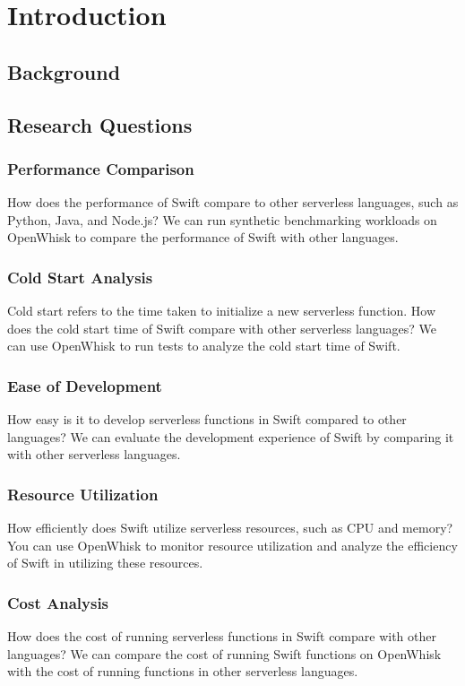 \chapter{Introduction}
\section{Background}
\section{Research Questions}
\subsection{Performance Comparison}
How does the performance of Swift compare to other serverless languages, such as Python, Java, and Node.js? We can run synthetic benchmarking workloads on OpenWhisk to compare the performance of Swift with other languages.
\subsection{Cold Start Analysis}
Cold start refers to the time taken to initialize a new serverless function. How does the cold start time of Swift compare with other serverless languages? We can use OpenWhisk to run tests to analyze the cold start time of Swift.
\subsection{Ease of Development}
How easy is it to develop serverless functions in Swift compared to other languages? We can evaluate the development experience of Swift by comparing it with other serverless languages.
\subsection{Resource Utilization}
How efficiently does Swift utilize serverless resources, such as CPU and memory? You can use OpenWhisk to monitor resource utilization and analyze the efficiency of Swift in utilizing these resources.
\subsection{Cost Analysis}
How does the cost of running serverless functions in Swift compare with other languages? We can compare the cost of running Swift functions on OpenWhisk with the cost of running functions in other serverless languages.
